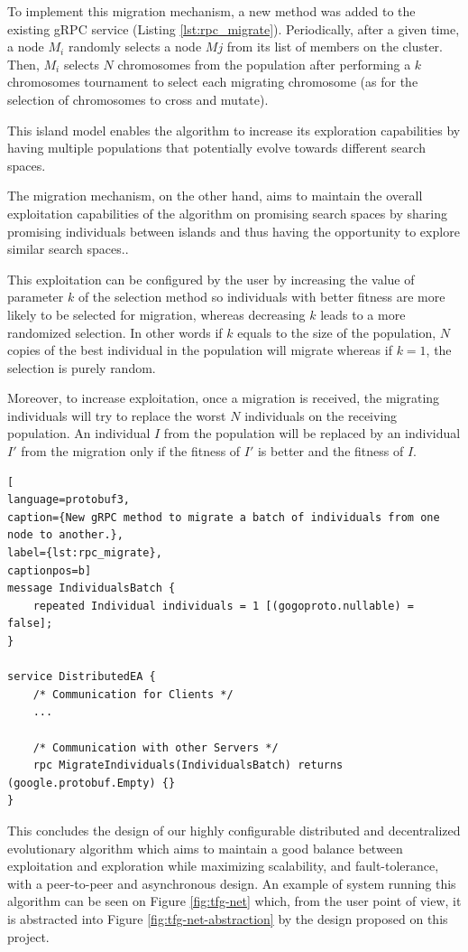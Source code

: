 To implement this migration mechanism, a new method was added to the existing gRPC service (Listing \ref{lst:rpc_migrate}). Periodically, after a given time, a node $M_{i}$ randomly selects a node $M{j}$ from its list of members on the cluster. Then, $M_{i}$ selects $N$ chromosomes from the population after performing a $k$ chromosomes tournament to select each migrating chromosome (as for the selection of chromosomes to cross and mutate).

This island model enables the algorithm to increase its exploration capabilities by having multiple populations that potentially evolve towards different search spaces. 

The migration mechanism, on the other hand, aims to maintain the overall exploitation capabilities of the algorithm on promising search spaces by sharing promising individuals between islands and thus having the opportunity to explore similar search spaces.. 

This exploitation can be configured by the user by increasing the value of parameter $k$ of the selection method so individuals with better fitness are more likely to be selected for migration, whereas decreasing $k$ leads to a more randomized selection. In other words if $k$ equals to the size of the population, $N$ copies of the best individual in the population will migrate whereas if $k = 1$, the selection is purely random.

Moreover, to increase exploitation, once a migration is received, the migrating individuals will try to replace the worst $N$ individuals on the receiving population. An individual $I$ from the population  will be replaced by an individual $I'$ from the migration only if the fitness of $I'$ is better and the fitness of $I$.

\begin{lstlisting}[
language=protobuf3,
caption={New gRPC method to migrate a batch of individuals from one node to another.},
label={lst:rpc_migrate},
captionpos=b]
message IndividualsBatch {
    repeated Individual individuals = 1 [(gogoproto.nullable) = false];
}

service DistributedEA {
    /* Communication for Clients */
    ...

    /* Communication with other Servers */
    rpc MigrateIndividuals(IndividualsBatch) returns (google.protobuf.Empty) {}
}
\end{lstlisting}

This concludes the design of our highly configurable distributed and decentralized evolutionary algorithm which aims to maintain a good balance between exploitation and exploration while maximizing scalability, and fault-tolerance, with a peer-to-peer and asynchronous design. An example of system running this algorithm can be seen on Figure \ref{fig:tfg-net} which, from the user point of view, it is abstracted into Figure \ref{fig:tfg-net-abstraction} by the design proposed on this project.


